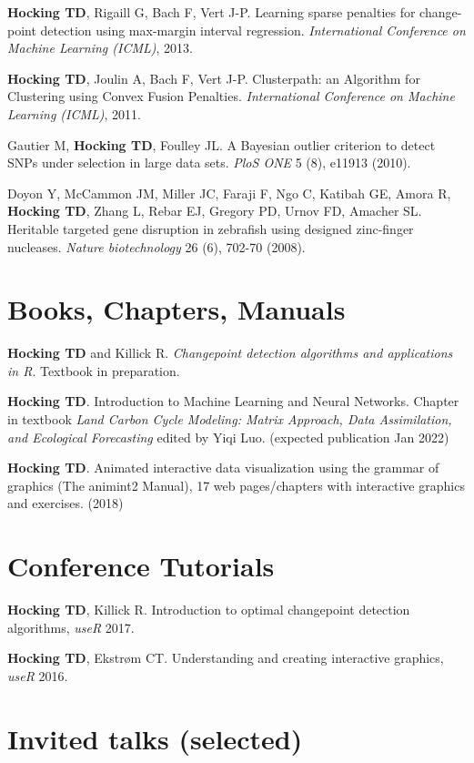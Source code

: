 \documentclass[margin,line]{res}
\begin{document}
\begin{resume}
{\bf Hocking TD}, Rigaill G, Bach F, Vert J-P. Learning sparse
penalties for change-point detection using max-margin interval
regression. {\it International Conference on Machine Learning (ICML)}, 2013.

{\bf Hocking TD}, Joulin A, Bach F, Vert J-P. Clusterpath: an
Algorithm for Clustering using Convex Fusion Penalties. {\it International Conference on Machine Learning (ICML)}, 2011.

Gautier M, {\bf Hocking TD}, Foulley JL. A Bayesian outlier criterion
to detect SNPs under selection in large data sets. {\it PloS ONE} 5
(8), e11913 (2010).

Doyon Y, McCammon JM, Miller JC, Faraji F, Ngo C, Katibah GE, Amora R,
{\bf Hocking TD}, Zhang L, Rebar EJ, Gregory PD, Urnov FD, Amacher
SL. Heritable targeted gene disruption in zebrafish using designed
zinc-finger nucleases. {\it Nature biotechnology} 26 (6), 702-70
(2008).

\section{\sc Books, Chapters, Manuals}

{\bf Hocking TD} and Killick R. {\it Changepoint detection algorithms
  and applications in R}. Textbook in preparation.

{\bf Hocking TD}. Introduction to Machine Learning and Neural
Networks. Chapter in textbook {\it Land Carbon Cycle Modeling: Matrix
  Approach, Data Assimilation, and Ecological Forecasting} edited by
Yiqi Luo. (expected publication Jan 2022)

{\bf Hocking TD}. Animated interactive data visualization using the
grammar of graphics (The animint2 Manual), 17 web pages/chapters with
interactive graphics and exercises. (2018)

\section{\sc Conference Tutorials}

{\bf Hocking TD}, Killick R. Introduction to optimal changepoint
detection algorithms, {\it useR} 2017.

{\bf Hocking TD}, Ekstr\o m CT. Understanding and creating interactive
graphics, {\it useR} 2016.

\section{\sc Invited talks (selected)}


\end{resume}
\end{document}
